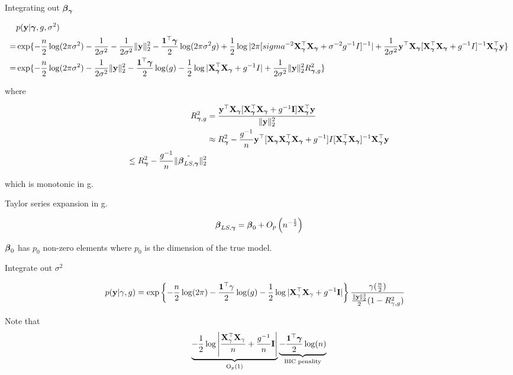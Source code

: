\documentclass{amsart}
\begin{document}
Integrating out ${\boldsymbol \beta}_{\boldsymbol \gamma}$

\begin{align*}
&p({\bf y} | {\boldsymbol \gamma}, g, \sigma^2) \\
=& \exp\{-\frac{n}{2} \log(2 \pi \sigma^2) - \frac{1}{2 \sigma^2} - \frac{1}{2 \sigma^2} \|{\bf y}\|_2^2
				-\frac{{\bf 1}^\top {\boldsymbol\gamma}}{2} \log(2 \pi \sigma^2 g)
				+ \frac{1}{2} \log |2 \pi [sigma^{-2} {\bf X}_{\boldsymbol \gamma}^\top {\bf X}_{\boldsymbol \gamma} + \sigma^{-2} g^{-1} I]^{-1}|
				+ \frac{1}{2 \sigma^2} {\bf y}^\top {\bf X}_{\boldsymbol \gamma} [{\bf X}_{\boldsymbol \gamma}^\top {\bf X}_{\boldsymbol \gamma} + g^{-1} I]^{-1} {\bf X}_{\boldsymbol \gamma}^\top {\bf y}\} \\
=& \exp\{-\frac{n}{2} \log(2 \pi \sigma^2) - \frac{1}{2 \sigma^2} \|{\bf y}\|_2^2 - \frac{{\bf 1}^\top {\boldsymbol\gamma}}{2} \log(g)
				-\frac{1}{2} \log|{\bf X}_{\boldsymbol \gamma}^\top {\bf X}_{\boldsymbol \gamma} + g^{-1}I| + \frac{1}{2 \sigma^2} \|{\bf y}\|_2^2 R_{{\boldsymbol \gamma}, g}^2\}
\end{align*}

where

\begin{align*}
R_{{\boldsymbol \gamma}, g}^2 &= \frac{{\bf y}^\top {\bf X}_{\boldsymbol \gamma} [{\bf X}_{\boldsymbol \gamma}^\top {\bf X}_{\boldsymbol \gamma} + g^{-1} {\bf I}] {\bf X}_{\boldsymbol \gamma}^\top {\bf y}}{\|{\bf y}\|_2^2} \\
&\approx R_{\boldsymbol \gamma}^2 - \frac{g^{-1}}{n} {\bf y}^\top [{\bf X}_{\boldsymbol \gamma} {\bf X}_{\boldsymbol \gamma}^\top {\bf X}_{\boldsymbol \gamma} + g^{-1}] I [{\bf X}_{\boldsymbol \gamma}^\top {\bf X}_{\boldsymbol \gamma}]^{-1} {\bf X}_{\boldsymbol \gamma}^\top {\bf y} \\
\leq R_{\boldsymbol \gamma}^2 - \frac{g^{-1}}{n} \| \hat{{\boldsymbol \beta}_{LS, {\boldsymbol \gamma}}} \|_2^2
\end{align*}

which is monotonic in g.

Taylor series expansion in g.

\begin{equation*}
{\boldsymbol\beta}_{LS, {\boldsymbol \gamma}} = {\boldsymbol \beta}_0 + O_p\left(n^{-\frac{1}{2}}\right)
\end{equation*}

${\boldsymbol \beta}_0$ has $p_0$ non-zero elements where $p_0$ is the dimension of the true model.

Integrate out $\sigma^2$

\begin{align*}
p({\bf y} | \gamma, g) &= \exp \left \{ -\frac{n}{2} \log(2 \pi) - \frac{{\bf 1}^\top \gamma}{2} \log(g)
															-\frac{1}{2} \log|{\bf X}_\gamma^\top {\bf X}_\gamma + g^{-1} {\bf I}| \right \}
											\frac{\gamma(\frac{n}{2})}{\frac{\|{\bf y}\|_2^2}{2}(1 - R_{\gamma, g}^2)}
\end{align*}

Note that
\begin{equation*}
\underbrace{-\frac{1}{2} \log\left |\frac{{\bf X}_\gamma^\top {\bf X}_\gamma}{n} + \frac{g^{-1}}{n} {\bf I} \right |}_{\text{O}_p(1)}
\underbrace{- \frac{{\bf 1}^\top {\boldsymbol\gamma}}{2} \log(n)}_{\text{BIC penality}}
\end{equation*}
\end{document}
